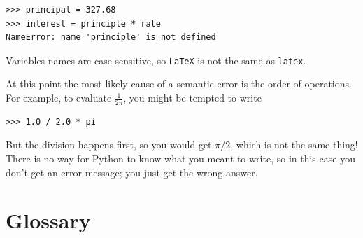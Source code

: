 \documentclass[10pt]{book}
\begin{document}
\beforeverb
\begin{verbatim}
>>> principal = 327.68
>>> interest = principle * rate
NameError: name 'principle' is not defined
\end{verbatim}
\afterverb
%
Variables names are case sensitive, so {\tt LaTeX} is not the
same as {\tt latex}.


At this point the most likely cause of a semantic error is
the order of operations.  For example, to evaluate $\frac{1}{2 \pi}$,
you might be tempted to write

\beforeverb
\begin{verbatim}
>>> 1.0 / 2.0 * pi
\end{verbatim}
\afterverb
%
But the division happens first, so you would get $\pi / 2$, which
is not the same thing!  There is no way for Python
to know what you meant to write, so in this case you don't
get an error message; you just get the wrong answer.



\section{Glossary}
\end{document}
